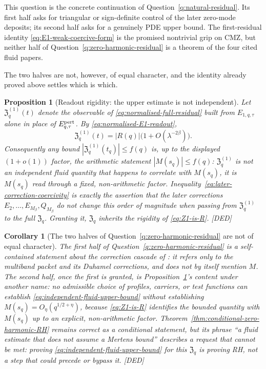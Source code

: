 \documentclass[11pt]{amsart}
\numberwithin{equation}{section}
\theoremstyle{plain}
\newtheorem{proposition}[theorem]{Proposition}
\newtheorem{corollary}[theorem]{Corollary}
\theoremstyle{definition}
\theoremstyle{remark}
\begin{document}
This question is the concrete continuation of
Question~\ref{q:natural-residual}.  Its first half asks for triangular or
sign-definite control of the later zero-mode deposits; its second half asks
for a genuinely PDE upper bound.  The first-residual identity
\eqref{eq:E1-weak-coercive-form} is the promised nontrivial grip on CMZ, but
neither half of Question~\ref{q:zero-harmonic-residual} is a theorem of the
four cited fluid papers.

The two halves are not, however, of equal character, and the identity
already proved above settles which is which.

\begin{proposition}[Readout rigidity: the upper estimate is not independent]
\label{prop:readout-rigidity}
Let $\mathfrak Z_q^{(1)}(t)$ denote the observable of
\eqref{eq:normalised-full-residual} built from $E_{1,q,\tau}$ alone in place
of $E^{\rm pert}_{q,\tau}$.  By \eqref{eq:normalised-E1-readout},
\begin{equation}
\mathfrak Z_q^{(1)}(t)=|R(q)|\bigl(1+O(\lambda^{-2\beta})\bigr).
\label{eq:Z1-is-R}
\end{equation}
Consequently any bound $|\mathfrak Z_q^{(1)}(t_q)|\le f(q)$ is, up to the
displayed $(1+o(1))$ factor, the arithmetic statement $|M(s_q)|\le f(q)$:
$\mathfrak Z_q^{(1)}$ is not an independent fluid quantity that happens to
correlate with $M(s_q)$, it is $M(s_q)$ read through a fixed,
non-arithmetic factor.  Inequality~\eqref{eq:later-correction-coercivity} is
exactly the assertion that the later corrections
$E_2,\ldots,E_{M_\beta},Q_{M_\beta}$ do not change this order of magnitude
when passing from $\mathfrak Z_q^{(1)}$ to the full $\mathfrak Z_q$.
Granting it, $\mathfrak Z_q$ inherits the rigidity of
\eqref{eq:Z1-is-R}.  \textup{[DED]}
\end{proposition}

\begin{corollary}[The two halves of Question~\ref{q:zero-harmonic-residual} are not of equal character]
\label{cor:not-equal-character}
The first half of Question~\ref{q:zero-harmonic-residual} is a
self-contained statement about the correction cascade of
\cite{AlpogeBuckmasterCoiculescu2026}: it refers only to the multiband
packet and its Duhamel corrections, and does not by itself mention $M$.
The second half, once the first is granted, is
Proposition~\ref{prop:readout-rigidity}'s content under another name: no
admissible choice of profiles, carriers, or test functions can establish
\eqref{eq:independent-fluid-upper-bound} without establishing
$M(s_q)=O_\eta(q^{1/2+\eta})$, because \eqref{eq:Z1-is-R} identifies the
bounded quantity with $M(s_q)$ up to an explicit, non-arithmetic factor.
Theorem~\ref{thm:conditional-zero-harmonic-RH} remains correct as a
conditional statement, but its phrase ``a fluid estimate that does not
assume a Mertens bound'' describes a request that cannot be met: proving
\eqref{eq:independent-fluid-upper-bound} for this $\mathfrak Z_q$ \emph{is}
proving RH, not a step that could precede or bypass it.  \textup{[DED]}
\end{corollary}
\end{document}
